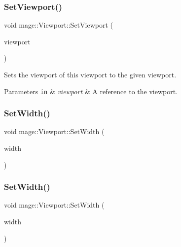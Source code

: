 \subsubsection{\texorpdfstring{Set\+Viewport()}{SetViewport()}\hspace{0.1cm}{\footnotesize\ttfamily [2/2]}}
{\footnotesize\ttfamily void mage\+::\+Viewport\+::\+Set\+Viewport (\begin{DoxyParamCaption}\item[{D3\+D11\+\_\+\+V\+I\+E\+W\+P\+O\+RT \&\&}]{viewport }\end{DoxyParamCaption})\hspace{0.3cm}{\ttfamily [noexcept]}}

Sets the viewport of this viewport to the given viewport.


\begin{DoxyParams}[1]{Parameters}
\mbox{\tt in}  & {\em viewport} & A reference to the viewport. \\
\hline
\end{DoxyParams}
\hypertarget{classmage_1_1_viewport_a13f5587df2929ca0368e4434a3a45753}{}\label{classmage_1_1_viewport_a13f5587df2929ca0368e4434a3a45753} 
\subsubsection{\texorpdfstring{Set\+Width()}{SetWidth()}\hspace{0.1cm}{\footnotesize\ttfamily [1/2]}}
{\footnotesize\ttfamily void mage\+::\+Viewport\+::\+Set\+Width (\begin{DoxyParamCaption}\item[{\hyperlink{namespacemage_a41c104c036fba3756a74e19f793eeaa1}{U32}}]{width }\end{DoxyParamCaption})\hspace{0.3cm}{\ttfamily [noexcept]}}

\hypertarget{classmage_1_1_viewport_a377016fb769c86677d7a17c2b19960f3}{}\label{classmage_1_1_viewport_a377016fb769c86677d7a17c2b19960f3} 
\subsubsection{\texorpdfstring{Set\+Width()}{SetWidth()}\hspace{0.1cm}{\footnotesize\ttfamily [2/2]}}
{\footnotesize\ttfamily void mage\+::\+Viewport\+::\+Set\+Width (\begin{DoxyParamCaption}\item[{\hyperlink{namespacemage_aa97e833b45f06d60a0a9c4fc22ae02c0}{F32}}]{width }\end{DoxyParamCaption})\hspace{0.3cm}{\ttfamily [noexcept]}}

